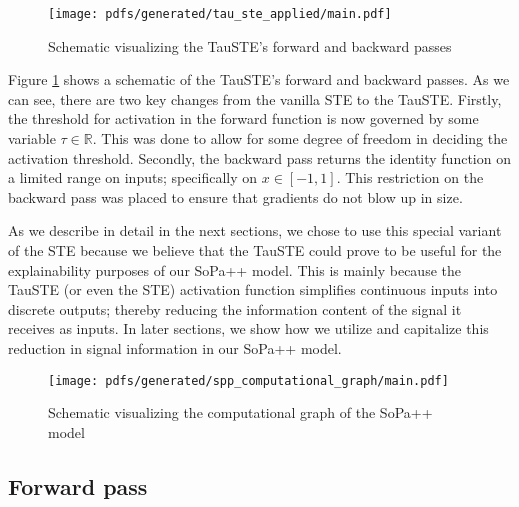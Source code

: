 \begin{figure}[t!]
  \centering
  \texttt{[image: pdfs/generated/tau\_ste\_applied/main.pdf]}
  \caption{Schematic visualizing the TauSTE's forward and backward passes}
  \label{fig:tau_ste}
\end{figure}

Figure \ref{fig:tau_ste} shows a schematic of the TauSTE's forward and backward
passes. As we can see, there are two key changes from the vanilla STE to the
TauSTE. Firstly, the threshold for activation in the forward function is now
governed by some variable $\tau \in \mathbb{R}$. This was done to allow for some degree of freedom
in deciding the activation threshold. Secondly, the backward pass returns the
identity function on a limited range on inputs; specifically on $x \in [-1,1]$.
This restriction on the backward pass was placed to ensure that gradients do not
blow up in size.

As we describe in detail in the next sections, we chose to use this special
variant of the STE because we believe that the TauSTE could prove to be useful
for the explainability purposes of our SoPa++ model. This is mainly because the
TauSTE (or even the STE) activation function simplifies continuous inputs into
discrete outputs; thereby reducing the information content of the signal it
receives as inputs. In later sections, we show how we utilize and capitalize
this reduction in signal information in our SoPa++ model.

\begin{figure}[t!]
  \centering
  \texttt{[image: pdfs/generated/spp\_computational\_graph/main.pdf]}
  \caption{Schematic visualizing the computational graph of the SoPa++ model}
  \label{fig:spp_cg}
\end{figure}

\subsection{Forward pass}

